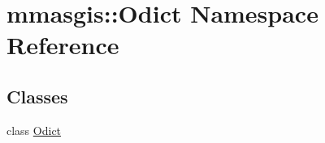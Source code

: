 \hypertarget{namespacemmasgis_1_1Odict}{
\section{mmasgis::Odict Namespace Reference}
\label{namespacemmasgis_1_1Odict}
}
\subsection*{Classes}
\begin{DoxyCompactItemize}
\item 
class \hyperlink{classmmasgis_1_1Odict_1_1Odict}{Odict}
\end{DoxyCompactItemize}

